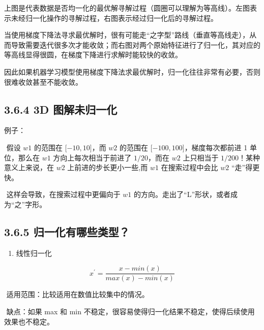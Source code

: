  

​
上图是代表数据是否均一化的最优解寻解过程（圆圈可以理解为等高线）。左图表示未经归一化操作的寻解过程，右图表示经过归一化后的寻解过程。

​
当使用梯度下降法寻求最优解时，很有可能走``之字型''路线（垂直等高线走），从而导致需要迭代很多次才能收敛；而右图对两个原始特征进行了归一化，其对应的等高线显得很圆，在梯度下降进行求解时能较快的收敛。

​
因此如果机器学习模型使用梯度下降法求最优解时，归一化往往非常有必要，否则很难收敛甚至不能收敛。

\subsection{3.6.4 3D
图解未归一化}\label{d-ux56feux89e3ux672aux5f52ux4e00ux5316}

例子：

​ 假设 $ w1 $ 的范围在 $ {[}-10, 10{]} $，而 $ w2 $ 的范围在 $
{[}-100, 100{]} $，梯度每次都前进 1 单位，那么在 $ w1 $
方向上每次相当于前进了 $ 1/20 $，而在 $ w2 $ 上只相当于 $ 1/200
$！某种意义上来说，在 $ w2 $ 上前进的步长更小一些,而 $ w1 $
在搜索过程中会比 $ w2 $ ``走''得更快。

​ 这样会导致，在搜索过程中更偏向于 $ w1 $
的方向。走出了``L''形状，或者成为``之''字形。

 

\subsection{3.6.5
归一化有哪些类型？}\label{ux5f52ux4e00ux5316ux6709ux54eaux4e9bux7c7bux578b}

\begin{enumerate}
\def\labelenumi{\arabic{enumi}.}
 
\item
  线性归一化
\end{enumerate}

\[
x^{\prime} = \frac{x-min(x)}{max(x) - min(x)}
\]

​ 适用范围：比较适用在数值比较集中的情况。

​ 缺点：如果 max 和 min
不稳定，很容易使得归一化结果不稳定，使得后续使用效果也不稳定。

